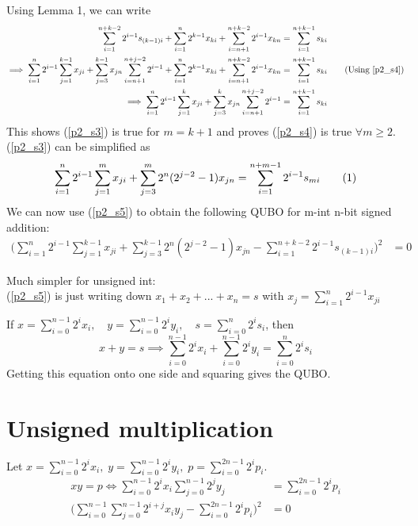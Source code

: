 \documentclass[12pt]{article}
\newcommand\numberthis{\addtocounter{equation}{1}\tag{\theequation}}
\begin{document}
Using Lemma 1, we can write
\begin{align*}
    \sum_{i=1}^{n+k-2}2^{i-1}s_{(k-1)i} + \sum_{i=1}^n2^{k-1}x_{ki} + \sum_{i=n+1}^{n+k-2}2^{i-1}x_{kn} &= \sum_{i=1}^{n+k-1}s_{ki}\\
    \implies \sum_{i=1}^{n}2^{i-1}\sum_{j=1}^{k-1}x_{ji} + \sum_{j=3}^{k-1}x_{jn}\sum_{i=n+1}^{n+j-2}2^{i-1} + \sum_{i=1}^n2^{k-1}x_{ki} + \sum_{i=n+1}^{n+k-2}2^{i-1}x_{kn} &= \sum_{i=1}^{n+k-1}s_{ki} \tag{Using \ref{p2_s4}}\\
    \implies \sum_{i=1}^{n}2^{i-1}\sum_{j=1}^{k}x_{ji} + \sum_{j=3}^{k}x_{jn}\sum_{i=n+1}^{n+j-2}2^{i-1} &= \sum_{i=1}^{n+k-1}s_{ki} 
\end{align*}
This shows (\ref{p2_s3}) is true for $m=k+1$ and proves (\ref{p2_s4}) is true $\forall m\geq2.$\\
(\ref{p2_s3}) can be simplified as 
\begin{align*}
    \sum_{i=1}^{n}2^{i-1}\sum_{j=1}^{m}x_{ji} + \sum_{j=3}^{m}2^n(2^{j-2}-1)x_{jn}
    = \sum_{i=1}^{n+m-1}2^{i-1}s_{mi} \numberthis{} \label{p2_s5}
\end{align*}
We can now use (\ref{p2_s5}) to obtain the following QUBO for m-int n-bit signed addition:
\begin{align*}
    \bigg(\sum_{i=1}^{n}2^{i-1}\sum_{j=1}^{k-1}x_{ji} + \sum_{j=3}^{k-1}2^n(2^{j-2}-1)x_{jn}
    - \sum_{i=1}^{n+k-2}2^{i-1}s_{(k-1)i}\bigg)^2 &= 0
\end{align*}

Much simpler for unsigned int:\\
(\ref{p2_s5}) is just writing down $x_1+x_2+...+x_n=s$ with $x_j=\sum_{i=1}^{n}2^{i-1}x_{ji}$

If $x=\sum_{i=0}^{n-1}2^{i}x_i,\quad y=\sum_{i=0}^{n-1}2^{i}y_i,\quad s=\sum_{i=0}^{n}2^{i}s_i$, then
$$x+y=s \implies \sum_{i=0}^{n-1}2^{i}x_i+\sum_{i=0}^{n-1}2^{i}y_i = \sum_{i=0}^{n}2^{i}s_i$$
Getting this equation onto one side and squaring gives the QUBO.

\section*{Unsigned multiplication}
Let $x=\sum_{i=0}^{n-1}2^{i}x_i,\; y=\sum_{i=0}^{n-1}2^{i}y_i,\; p=\sum_{i=0}^{2n-1}2^{i}p_i$.
\begin{align*}
    xy=p \iff \sum_{i=0}^{n-1}2^{i}x_i\sum_{j=0}^{n-1}2^{j}y_j &= \sum_{i=0}^{2n-1}2^{i}p_i\\
    \bigg(\sum_{i=0}^{n-1}\sum_{j=0}^{n-1}2^{i+j}x_iy_j - \sum_{i=0}^{2n-1}2^ip_i\bigg)^2 &= 0
\end{align*}
\end{document}
